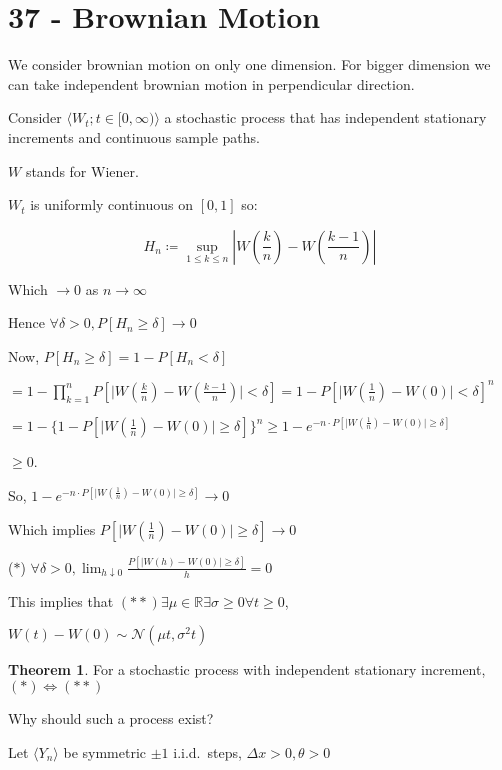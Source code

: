 \documentclass{article}
\theoremstyle{definition}
\newtheorem{theorem}{Theorem}
\begin{document}
\section*{37 - Brownian Motion}

We consider brownian motion on only one dimension. For bigger dimension we can take independent brownian motion in perpendicular direction.

Consider \(\langle W_t ; t\in [0,\infty) \rangle \) a stochastic process that has independent stationary increments and continuous sample paths.

\(W\) stands for Wiener.

\(W_t\) is uniformly continuous on \([0,1]\) so:

\[
    H_n \coloneqq \sup_{1 \leq k \leq n} \left\vert W \left( \frac{k}{n} \right) - W \left( \frac{k-1}{n} \right)   \right\vert 
\]

Which \(\to 0\) as \(n\to \infty\)  

Hence \(\forall \delta >0, P[H_n \geq \delta]\to 0\)

Now, \(P[H_n \geq \delta] = 1 - P[H_n < \delta]\)

\(= 1 - \prod_{k=1}^n P[\vert W(\frac{k}{n}) - W(\frac{k-1}{n}) \vert < \delta]= 1 - P[\vert W(\frac{1}{n}) - W(0) \vert < \delta ]^n\)

\(= 1 - \{ 1 - P[\vert W(\frac{1}{n}) - W(0) \vert \geq \delta ] \}^n \geq 1 - e^{- n \cdot P[\vert W(\frac{1}{n}) - W(0) \vert \geq \delta ]} \) 

\(\geq 0\).

So, \(1-e^{-n\cdot P[\vert W(\frac{1}{n}) - W(0) \vert \geq \delta ]} \to 0\)

Which implies \(P[\vert W(\frac{1}{n})- W(0) \vert \geq \delta ]\to 0\) 

(\(\ast\)) \(\forall \delta > 0, \lim_{h \downarrow 0} \frac{P[\vert W(h) - W(0) \vert \geq \delta ]}{h} = 0\) 

This implies that \((\ast\ast) \exists \mu \in\mathbb{R} \exists \sigma \geq 0 \forall t \geq 0\),

\(W(t)-W(0)\sim \mathcal{N}(\mu t, \sigma^2 t)\) 

\begin{theorem}
    For a stochastic process with independent stationary increment, \((\ast) \iff (\ast\ast)\) 
\end{theorem}

Why should such a process exist?

Let \(\langle Y_n \rangle \) be symmetric \(\pm 1\) i.i.d.\  steps, \(\Delta x > 0, \theta > 0\)
\end{document}
